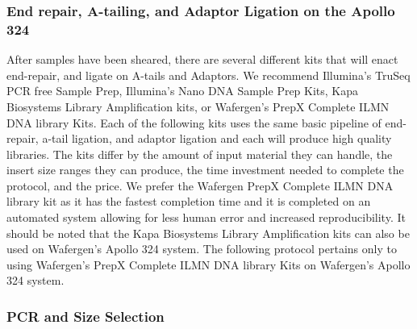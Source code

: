 \documentclass[graybox]{svmult}
\begin{document}
\subsubsection{End repair, A-tailing, and Adaptor Ligation on the Apollo 324}

After samples have been sheared, there are several different kits that will enact end-repair, and ligate on A-tails and Adaptors. We recommend Illumina’s TruSeq PCR free Sample Prep, Illumina’s Nano DNA Sample Prep Kits, Kapa Biosystems Library Amplification kits, or Wafergen’s PrepX Complete ILMN DNA library Kits. Each of the following kits uses the same basic pipeline of end-repair, a-tail ligation, and adaptor ligation and each will produce high quality libraries. The kits differ by the amount of input material they can handle, the insert size ranges they can produce, the time investment needed to complete the protocol, and the price. We prefer the Wafergen PrepX Complete ILMN DNA library kit as it has the fastest completion time and it is completed on an automated system allowing for less human error and increased reproducibility. It should be noted that the Kapa Biosystems Library Amplification kits can also be used on Wafergen’s Apollo 324 system. The following protocol pertains only to using Wafergen’s PrepX Complete ILMN DNA library Kits on Wafergen’s Apollo 324 system.


\subsubsection{PCR and Size Selection}
\end{document}
